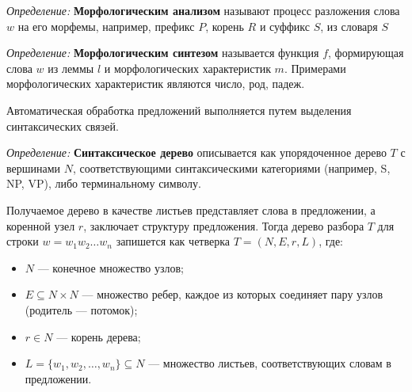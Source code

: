 \textit{Определение:} \textbf{Морфологическим анализом} называют процесс разложения 
слова $w$ на его морфемы, например, префикс $P$, корень $R$ и суффикс $S$, из словаря $S$

\textit{Определение:} \textbf{Морфологическим синтезом} называется функция $f$,
формирующая слова $w$ из леммы $l$ и морфологических характеристик $m$. 
Примерами морфологических характеристик являются число, род, падеж.

Автоматическая обработка предложений выполняется путем выделения синтаксических связей.

\textit{Определение:} \textbf{Синтаксическое дерево} описывается как упорядоченное дерево $T$ с вершинами $N$, соответствующими
синтаксическими категориями (например, S, NP, VP), либо терминальному символу.

Получаемое дерево в качестве листьев представляет слова в предложении, а коренной узел $r$, заключает структуру предложения. 
Тогда дерево разбора $T$ для строки $w = w_1 w_2 \ldots w_n$ запишется как четверка $T = (N, E, r, L)$, где: 
\begin{itemize}
    \item $N$ --- конечное множество узлов;
    \item $E \subseteq N \times N$ --- множество ребер, каждое из которых соединяет пару узлов (родитель — потомок);
    \item  $r \in N$ --- корень дерева;
    \item $L = \{ w_1, w_2, \ldots, w_n \} \subseteq N$ --- множество листьев, соответствующих словам в предложении.
\end{itemize}
